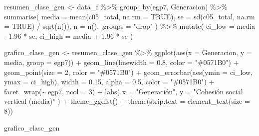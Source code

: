 \documentclass[
  spanish,
  a4paper,
  oneside]{scrbook}
\newenvironment{Shaded}{\begin{snugshade}}{\end{snugshade}}
\newcommand{\AttributeTok}[1]{\textcolor[rgb]{0.40,0.45,0.13}{#1}}
\newcommand{\ConstantTok}[1]{\textcolor[rgb]{0.56,0.35,0.01}{#1}}
\newcommand{\DecValTok}[1]{\textcolor[rgb]{0.68,0.00,0.00}{#1}}
\newcommand{\FloatTok}[1]{\textcolor[rgb]{0.68,0.00,0.00}{#1}}
\newcommand{\FunctionTok}[1]{\textcolor[rgb]{0.28,0.35,0.67}{#1}}
\newcommand{\NormalTok}[1]{\textcolor[rgb]{0.00,0.23,0.31}{#1}}
\newcommand{\OtherTok}[1]{\textcolor[rgb]{0.00,0.23,0.31}{#1}}
\newcommand{\SpecialCharTok}[1]{\textcolor[rgb]{0.37,0.37,0.37}{#1}}
\newcommand{\StringTok}[1]{\textcolor[rgb]{0.13,0.47,0.30}{#1}}
\begin{document}
\begin{Shaded}
\begin{Highlighting}[]
\NormalTok{resumen\_clase\_gen }\OtherTok{\textless{}{-}}\NormalTok{ data\_f }\SpecialCharTok{\%\textgreater{}\%}
  \FunctionTok{group\_by}\NormalTok{(egp7, Generacion) }\SpecialCharTok{\%\textgreater{}\%}
  \FunctionTok{summarise}\NormalTok{(}
    \AttributeTok{media   =} \FunctionTok{mean}\NormalTok{(c05\_total, }\AttributeTok{na.rm =} \ConstantTok{TRUE}\NormalTok{),}
    \AttributeTok{se      =} \FunctionTok{sd}\NormalTok{(c05\_total, }\AttributeTok{na.rm =} \ConstantTok{TRUE}\NormalTok{) }\SpecialCharTok{/} \FunctionTok{sqrt}\NormalTok{(}\FunctionTok{n}\NormalTok{()),}
    \AttributeTok{n       =} \FunctionTok{n}\NormalTok{(),}
    \AttributeTok{.groups =} \StringTok{"drop"}
\NormalTok{  ) }\SpecialCharTok{\%\textgreater{}\%}
  \FunctionTok{mutate}\NormalTok{(}
    \AttributeTok{ci\_low  =}\NormalTok{ media }\SpecialCharTok{{-}} \FloatTok{1.96} \SpecialCharTok{*}\NormalTok{ se,}
    \AttributeTok{ci\_high =}\NormalTok{ media }\SpecialCharTok{+} \FloatTok{1.96} \SpecialCharTok{*}\NormalTok{ se}
\NormalTok{  )}

\NormalTok{grafico\_clase\_gen }\OtherTok{\textless{}{-}}\NormalTok{ resumen\_clase\_gen }\SpecialCharTok{\%\textgreater{}\%}
  \FunctionTok{ggplot}\NormalTok{(}\FunctionTok{aes}\NormalTok{(}\AttributeTok{x =}\NormalTok{ Generacion, }\AttributeTok{y =}\NormalTok{ media, }\AttributeTok{group =}\NormalTok{ egp7)) }\SpecialCharTok{+}
  \FunctionTok{geom\_line}\NormalTok{(}\AttributeTok{linewidth =} \FloatTok{0.8}\NormalTok{, }\AttributeTok{color =} \StringTok{"\#0571B0"}\NormalTok{) }\SpecialCharTok{+}
  \FunctionTok{geom\_point}\NormalTok{(}\AttributeTok{size =} \DecValTok{2}\NormalTok{, }\AttributeTok{color =} \StringTok{"\#0571B0"}\NormalTok{) }\SpecialCharTok{+}
  \FunctionTok{geom\_errorbar}\NormalTok{(}\FunctionTok{aes}\NormalTok{(}\AttributeTok{ymin =}\NormalTok{ ci\_low, }\AttributeTok{ymax =}\NormalTok{ ci\_high),}
                \AttributeTok{width =} \FloatTok{0.15}\NormalTok{, }\AttributeTok{alpha =} \FloatTok{0.5}\NormalTok{, }\AttributeTok{color =} \StringTok{"\#0571B0"}\NormalTok{) }\SpecialCharTok{+}
  \FunctionTok{facet\_wrap}\NormalTok{(}\SpecialCharTok{\textasciitilde{}}\NormalTok{ egp7, }\AttributeTok{ncol =} \DecValTok{3}\NormalTok{) }\SpecialCharTok{+}
  \FunctionTok{labs}\NormalTok{(}
    \AttributeTok{x =} \StringTok{"Generación"}\NormalTok{,}
    \AttributeTok{y =} \StringTok{"Cohesión social vertical (media)"}
\NormalTok{  ) }\SpecialCharTok{+}
  \FunctionTok{theme\_ggdist}\NormalTok{() }\SpecialCharTok{+}
  \FunctionTok{theme}\NormalTok{(}\AttributeTok{strip.text =} \FunctionTok{element\_text}\NormalTok{(}\AttributeTok{size =} \DecValTok{8}\NormalTok{))}

\NormalTok{grafico\_clase\_gen}
\end{Highlighting}
\end{Shaded}
\end{document}

